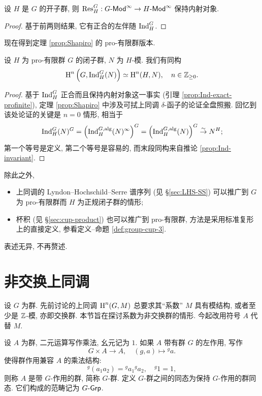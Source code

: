 \begin{corollary}\label{prop:Res-injective-profinite}
	设 $H$ 是 $G$ 的开子群, 则 $\operatorname{Res}^G_H: G\text{-}\mathsf{Mod}^\infty \to H\text{-}\mathsf{Mod}^\infty$ 保持内射对象.
\end{corollary}
\begin{proof}
	基于前两则结果, 它有正合的左伴随 $\operatorname{Ind}^G_H$.
\end{proof}

现在得到定理 \ref{prop:Shapiro} 的 pro-有限群版本.

\begin{proposition}
	设 $H$ 为 pro-有限群 $G$ 的闭子群, $N$ 为 $H$-模. 我们有同构
	\[ \operatorname{H}^n\left(G, \operatorname{Ind}^G_H(N)\right) \simeq \operatorname{H}^n(H, N), \quad n \in \mathbb{Z}_{\geq 0}. \]
\end{proposition}
\begin{proof}
	基于 $\operatorname{Ind}^G_H$ 正合而且保持内射对象这一事实 (引理 \ref{prop:Ind-exact-profinite}), 定理 \ref{prop:Shapiro} 中涉及可拭上同调 $\delta$-函子的论证全盘照搬. 回忆到该处论证的关键是 $n=0$ 情形, 相当于
	\[ \operatorname{Ind}^G_H(N)^G = \left(\operatorname{Ind}^{G, \mathrm{alg}}_H(N)^\infty \right)^G = \left(\operatorname{Ind}^{G, \mathrm{alg}}_H(N)\right)^G \stackrel{\sim}{\rightarrow} N^H; \]
	第一个等号是定义, 第二个等号是容易的, 而末段同构来自推论 \ref{prop:Ind-invariant}.
\end{proof}

除此之外,
\begin{itemize}
	\item 上同调的 Lyndon--Hochschild--Serre 谱序列 (见 \S\ref{sec:LHS-SS}) 可以推广到 $G$ 为 pro-有限群而 $H$ 为正规闭子群的情形;
	\item 杯积 (见 \S\ref{sec:cup-product}) 也可以推广到 pro-有限群, 方法是采用标准复形上的直接定义, 参看定义--命题 \ref{def:group-cup-3}.
\end{itemize}
表述无异, 不再赘述.

\section{非交换上同调}\label{sec:nonabelian-coh}
设 $G$ 为群. 先前讨论的上同调 $\operatorname{H}^n(G, M)$ 总要求其``系数'' $M$ 具有模结构, 或者至少是 $\mathbb{Z}$-模, 亦即交换群. 本节旨在探讨系数为非交换群的情形. 今起改用符号 $A$ 代替 $M$.

\begin{definition}\label{def:G-group}
	设 $A$ 为群, 二元运算写作乘法, 幺元记为 $1$. 如果 $A$ 带有群 $G$ 的左作用, 写作
	\[ G \times A \to A, \quad (g, a) \mapsto {}^g a . \]
	使得群作用兼容 $A$ 的乘法结构:
	\[ {}^g (a_1 a_2) = {}^g a_1 {}^g a_2, \quad {}^g 1 = 1, \]
	则称 $A$ 是带 $G$-作用的群, 简称 $G$-群. 定义 $G$-群之间的同态为保持 $G$-作用的群同态. 它们构成的范畴记为 $G\text{-}\mathsf{Grp}$.
\end{definition}


